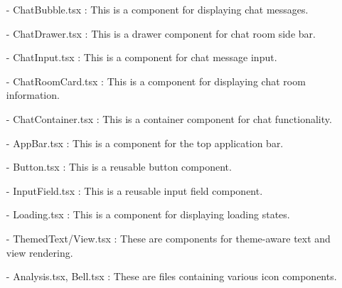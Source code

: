 \documentclass[conference]{IEEEtran}
\begin{document}
\begin{enumerate}
\begin{itemize}
\begin{itemize}
\begin{enumerate}
\begin{enumerate}
        \item[-] ChatBubble.tsx : This is a component for displaying chat messages. \\
        \item[-] ChatDrawer.tsx : This is a drawer component for chat room side bar. \\
        \item[-] ChatInput.tsx : This is a component for chat message input.\\
        \item[-] ChatRoomCard.tsx : This is a component for displaying chat room information. \\
        \item[-] ChatContainer.tsx : This is a container component for chat functionality.\\
        
        \item[-] AppBar.tsx : This is a component for the top application bar.\\
        \item[-] Button.tsx : This is a reusable button component.\\
        \item[-] InputField.tsx : This is a reusable input field component. \\
        \item[-] Loading.tsx : This is a component for displaying loading states.\\
        \item[-] ThemedText/View.tsx : These are components for theme-aware text and view rendering.\\
    
        \item[-] Analysis.tsx, Bell.tsx : These are files containing various icon components.\\


\end{enumerate}
\end{enumerate}
\end{itemize}
\end{itemize}
\end{enumerate}
\end{document}
